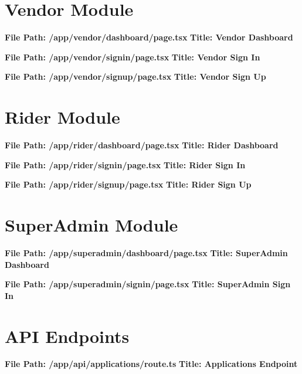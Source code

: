 \documentclass[12pt,a4paper]{book}
\begin{document}
\section{Vendor Module}

\noindent\textbf{File Path: /app/vendor/dashboard/page.tsx}
\noindent\textbf{Title: Vendor Dashboard}


\noindent\textbf{File Path: /app/vendor/signin/page.tsx}
\noindent\textbf{Title: Vendor Sign In}


\noindent\textbf{File Path: /app/vendor/signup/page.tsx}
\noindent\textbf{Title: Vendor Sign Up}


\section{Rider Module}

\noindent\textbf{File Path: /app/rider/dashboard/page.tsx}
\noindent\textbf{Title: Rider Dashboard}


\noindent\textbf{File Path: /app/rider/signin/page.tsx}
\noindent\textbf{Title: Rider Sign In}


\noindent\textbf{File Path: /app/rider/signup/page.tsx}
\noindent\textbf{Title: Rider Sign Up}


\section{SuperAdmin Module}

\noindent\textbf{File Path: /app/superadmin/dashboard/page.tsx}
\noindent\textbf{Title: SuperAdmin Dashboard}


\noindent\textbf{File Path: /app/superadmin/signin/page.tsx}
\noindent\textbf{Title: SuperAdmin Sign In}


\section{API Endpoints}

\noindent\textbf{File Path: /app/api/applications/route.ts}
\noindent\textbf{Title: Applications Endpoint}

\end{document}
